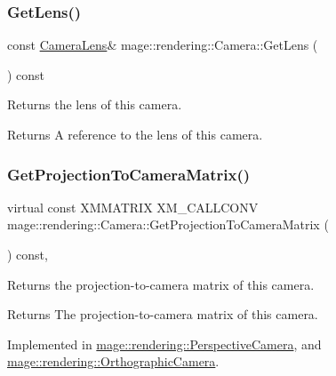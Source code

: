 \subsubsection{\texorpdfstring{Get\+Lens()}{GetLens()}\hspace{0.1cm}{\footnotesize\ttfamily [2/2]}}
{\footnotesize\ttfamily const \mbox{\hyperlink{classmage_1_1rendering_1_1_camera_lens}{Camera\+Lens}}\& mage\+::rendering\+::\+Camera\+::\+Get\+Lens (\begin{DoxyParamCaption}{ }\end{DoxyParamCaption}) const\hspace{0.3cm}{\ttfamily [noexcept]}}

Returns the lens of this camera.

\begin{DoxyReturn}{Returns}
A reference to the lens of this camera. 
\end{DoxyReturn}
\mbox{\label{classmage_1_1rendering_1_1_camera_abb21116f8a6c7513804431d23fa4cf17}} 
\subsubsection{\texorpdfstring{Get\+Projection\+To\+Camera\+Matrix()}{GetProjectionToCameraMatrix()}}
{\footnotesize\ttfamily virtual const X\+M\+M\+A\+T\+R\+IX X\+M\+\_\+\+C\+A\+L\+L\+C\+O\+NV mage\+::rendering\+::\+Camera\+::\+Get\+Projection\+To\+Camera\+Matrix (\begin{DoxyParamCaption}{ }\end{DoxyParamCaption}) const\hspace{0.3cm}{\ttfamily [pure virtual]}, {\ttfamily [noexcept]}}

Returns the projection-\/to-\/camera matrix of this camera.

\begin{DoxyReturn}{Returns}
The projection-\/to-\/camera matrix of this camera. 
\end{DoxyReturn}


Implemented in \mbox{\hyperlink{classmage_1_1rendering_1_1_perspective_camera_af049c6330ebdaa822bfd31dc88f25ac2}{mage\+::rendering\+::\+Perspective\+Camera}}, and \mbox{\hyperlink{classmage_1_1rendering_1_1_orthographic_camera_a7d52862a3762dcaeadf26e8ae92d9d09}{mage\+::rendering\+::\+Orthographic\+Camera}}.

